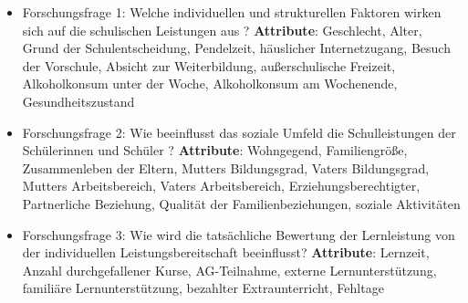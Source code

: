 \begin{itemize}
    \item Forschungsfrage 1: Welche individuellen und strukturellen Faktoren wirken sich auf die schulischen Leistungen aus ?
        \subitem \textbf{Attribute}: Geschlecht, Alter, Grund der Schulentscheidung, Pendelzeit, häuslicher Internetzugang, Besuch der Vorschule, Absicht zur Weiterbildung, außerschulische Freizeit, Alkoholkonsum unter der Woche, Alkoholkonsum am Wochenende, Gesundheitszustand
    \item Forschungsfrage 2: Wie beeinflusst das soziale Umfeld die Schulleistungen der Schülerinnen und Schüler ? 
        \subitem \textbf{Attribute}: Wohngegend, Familiengröße, Zusammenleben der Eltern, Mutters Bildungsgrad, Vaters Bildungsgrad, Mutters Arbeitsbereich, Vaters Arbeitsbereich, Erziehungsberechtigter, Partnerliche Beziehung, Qualität der Familienbeziehungen, soziale Aktivitäten
    \item Forschungsfrage 3: Wie wird die tatsächliche Bewertung der Lernleistung von der individuellen Leistungsbereitschaft beeinflusst?
        \subitem \textbf{Attribute}: Lernzeit, Anzahl durchgefallener Kurse, AG-Teilnahme, externe Lernunterstützung, familiäre Lernunterstützung, bezahlter Extraunterricht, Fehltage
\end{itemize}




